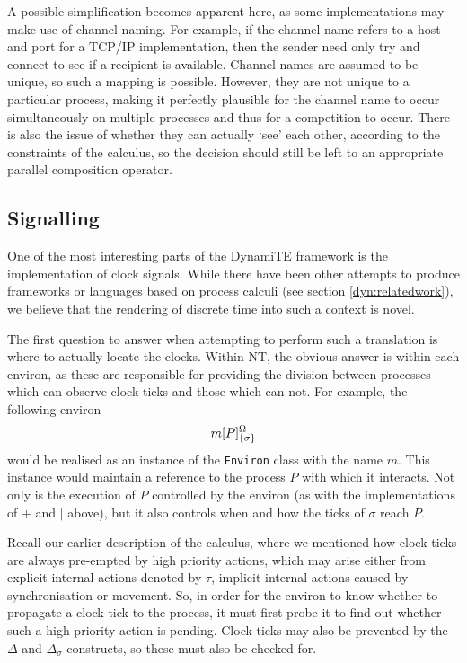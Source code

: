 A possible simplification becomes apparent here, as some implementations
may make use of channel naming.  For example, if the channel name refers
to a host and port for a TCP/IP implementation, then the sender need
only try and connect to see if a recipient is available.  Channel names
are assumed to be unique, so such a mapping is possible.  However, they
are not unique to a particular process, making it perfectly plausible
for the channel name to occur simultaneously on multiple processes and
thus for a competition to occur.  There is also the issue of whether
they can actually `see' each other, according to the constraints of the
calculus, so the decision should still be left to an appropriate
parallel composition operator.

\subsection{Signalling}
\label{dyn:signalling}

One of the most interesting parts of the DynamiTE framework is the
implementation of clock signals.  While there have been other attempts
to produce frameworks or languages based on process calculi (see section
\ref{dyn:relatedwork}), we believe that the rendering of discrete time into
such a context is novel.

The first question to answer when attempting to perform such a
translation is where to actually locate the clocks.  Within NT, the
obvious answer is within each environ, as these are responsible for
providing the division between processes which can observe clock ticks
and those which can not.  For example, the following environ
\begin{displaymath}
{m}[ P ]^{\Omega}_{\{\sigma\}}
\end{displaymath}
would be realised as an instance of the \texttt{Environ} class with the
name $m$.  This instance would maintain a reference to the process $P$
with which it interacts.  Not only is the execution of $P$ controlled by
the environ (as with the implementations of $+$ and $\mid$ above), but
it also controls when and how the ticks of $\sigma$ reach $P$.

Recall our earlier description of the calculus, where we mentioned how
clock ticks are always pre-empted by high priority actions, which may
arise either from explicit internal actions denoted by $\tau$, implicit
internal actions caused by synchronisation or movement.  So, in order
for the environ to know whether to propagate a clock tick to the
process, it must first probe it to find out whether such a high priority
action is pending.  Clock ticks may also be prevented by the $\Delta$
and $\Delta_\sigma$ constructs, so these must also be checked for.

